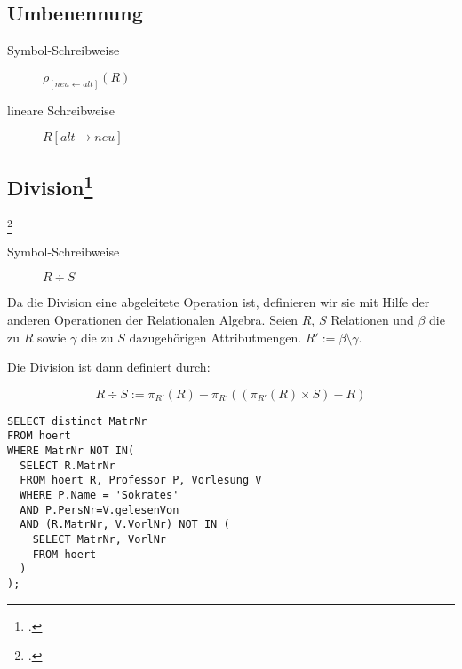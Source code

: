\documentclass{bschlangaul-theorie}
\begin{document}
%

\subsection{Umbenennung}

\begin{description}
\item[Symbol-Schreibweise] $\rho_{[{neu}\leftarrow alt]} (R)$
\item[lineare Schreibweise] $R[alt\rightarrow neu]$
\end{description}

%

\subsection{Division\footcite[Division]{wiki:relationale-algebra}}

\footcite[Seite 31-43]{db:fs:2}

\begin{description}
\item[Symbol-Schreibweise] $R \div S$
\end{description}

\noindent
Da die Division eine abgeleitete Operation ist, definieren wir sie mit
Hilfe der anderen Operationen der Relationalen Algebra. Seien $R$, $S$
Relationen und $\beta$ die zu $R$ sowie $\gamma$ die zu $S$
dazugehörigen Attributmengen. $R':=\beta \setminus \gamma$.

Die Division ist dann definiert durch:

\begin{displaymath}
R\div S :=
\pi_{R'}(R) -
\pi_{R'}((\pi_{R'}(R) \times S) - R)
\end{displaymath}

\begin{verbatim}
SELECT distinct MatrNr
FROM hoert
WHERE MatrNr NOT IN(
  SELECT R.MatrNr
  FROM hoert R, Professor P, Vorlesung V
  WHERE P.Name = 'Sokrates'
  AND P.PersNr=V.gelesenVon
  AND (R.MatrNr, V.VorlNr) NOT IN (
    SELECT MatrNr, VorlNr
    FROM hoert
  )
);
\end{verbatim}

%
\end{document}
